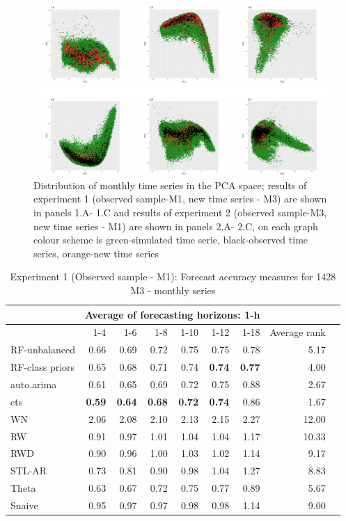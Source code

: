 \documentclass[11pt,a4paper,]{article}
\theoremstyle{definition}
\theoremstyle{definition}
\theoremstyle{definition}
\theoremstyle{remark}
\begin{document}
\begin{figure}

{\centering \includegraphics[width=\textwidth]{figure/pca3-1} 

}

\caption{Distribution of monthly time series in the PCA space; results of experiment 1 (observed sample-M1, new time series - M3) are shown in panels 1.A- 1.C and results of experiment 2 (observed sample-M3, new time series - M1) are shown in panels 2.A- 2.C, on each graph colour scheme is green-simulated time serie, black-observed time series, orange-new time series}\label{fig:pca3}
\end{figure}

\begin{table}[!h]
\centering
\caption{Experiment 1 (Observed sample - M1): Forecast accuracy measures for 1428 M3 - monthly series}
\label{M3M}
\begin{tabular}{lrrrrrrrr}
\hline
 & \multicolumn{6}{c}{Average of forecasting horizons: 1-h}    &  \\ \hline
 &  1-4& 1-6 & 1-8 & 1-10 & 1-12 & 1-18  & Average rank  \\ \hline
RF-unbalanced&  0.66& 0.69 & 0.72 & 0.75 & 0.75 & 0.78 & 5.17  \\ 
RF-class priors &  0.65& 0.68 & 0.71 & 0.74 & \bf{0.74} & \bf{0.77}  & 4.00  \\ auto.arima & 0.61 & 0.65 & 0.69 & 0.72 & 0.75 & 0.88 &  2.67   \\  
ets & \bf{0.59}  & \bf{0.64} & \bf{0.68} & \bf{0.72} & \bf{0.74} & 0.86 & 1.67   \\  
WN & 2.06 & 2.08 & 2.10 & 2.13 & 2.15 & 2.27 & 12.00   \\  
RW &0.91  &0.97  & 1.01 & 1.04 & 1.04 & 1.17 & 10.33  \\ 
RWD &0.90  & 0.96 &1.00  &1.03  & 1.02 & 1.14 & 9.17  \\ 
STL-AR & 0.73 & 0.81 & 0.90 & 0.98 & 1.04 & 1.27 & 8.83  \\ 
Theta & 0.63 & 0.67 & 0.72 & 0.75 & 0.77 & 0.89 & 5.67    \\ 
Snaive& 0.95 & 0.97 & 0.97 & 0.98 & 0.98 &  1.14& 9.00  \\ \hline
\end{tabular}
\end{table}
\end{document}
